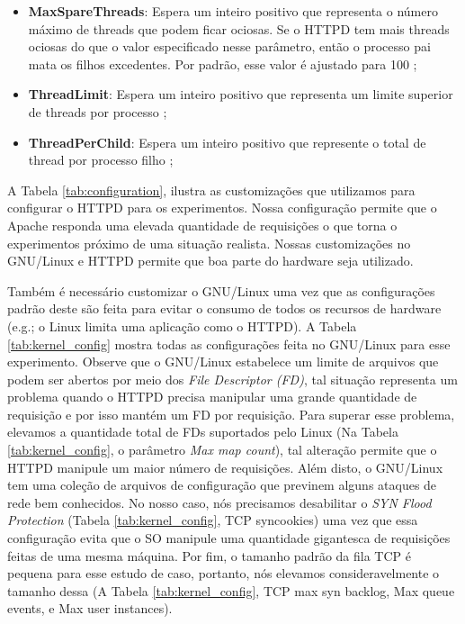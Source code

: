 \begin{itemize}
  \item \textbf{MaxSpareThreads}:
Espera um inteiro positivo que representa o número máximo de threads que podem
ficar ociosas. Se o HTTPD tem mais threads ociosas do que o valor especificado
nesse parâmetro, então o processo pai mata os filhos excedentes. Por padrão,
esse valor é ajustado para 100 \citep{mpm_maxsparethreads};

  \item \textbf{ThreadLimit}:
Espera um inteiro positivo que representa um limite superior de threads por
processo \citep{mpm_threadlimits};

  \item \textbf{ThreadPerChild}:
Espera um inteiro positivo que represente o total de thread por processo filho
\citep{mpm_threadperchild};

\end{itemize}



A Tabela \ref{tab:configuration}, ilustra as customizações que utilizamos para
configurar o HTTPD para os experimentos. Nossa configuração permite que o
Apache responda uma elevada quantidade de requisições o que torna o
experimentos próximo de uma situação realista. Nossas customizações no
GNU/Linux e HTTPD permite que boa parte do hardware seja utilizado.



Também é necessário customizar o GNU/Linux uma vez que as configurações padrão
deste são feita para evitar o consumo de todos os recursos de hardware (e.g.; o
Linux limita uma aplicação como o HTTPD). A Tabela \ref{tab:kernel_config}
mostra todas as configurações feita no GNU/Linux para esse experimento.
Observe que o GNU/Linux estabelece um limite de arquivos que podem ser abertos
por meio dos \emph{File Descriptor (FD)}, tal situação representa um problema
quando o HTTPD precisa manipular uma grande quantidade de requisição e por isso
mantém um FD por requisição. Para superar esse problema, elevamos a quantidade
total de FDs suportados pelo Linux (Na Tabela \ref{tab:kernel_config}, o
parâmetro \emph{Max map count}), tal alteração permite que o HTTPD manipule um
maior número de requisições. Além disto, o GNU/Linux tem uma coleção de
arquivos de configuração que previnem alguns ataques de rede bem conhecidos. No
nosso caso, nós precisamos desabilitar o \emph{SYN Flood Protection} (Tabela
\ref{tab:kernel_config}, TCP syncookies) uma vez que essa configuração evita
que o SO manipule uma quantidade gigantesca de requisições feitas de uma mesma
máquina. Por fim, o tamanho padrão da fila TCP é pequena para esse estudo de
caso, portanto, nós elevamos consideravelmente o tamanho dessa (A Tabela
\ref{tab:kernel_config}, TCP max syn backlog, Max queue events, e Max user
instances).

